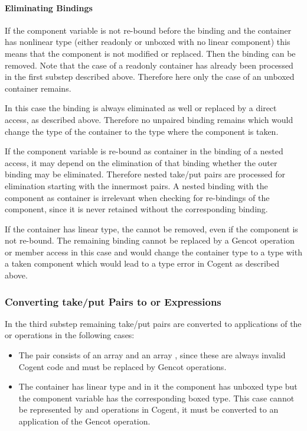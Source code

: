 \paragraph{Eliminating  Bindings}

If the component variable is not re-bound before the  binding and the container has nonlinear type (either readonly
or unboxed with no linear component) this means that the component is not modified or replaced. Then the  binding
can be removed. Note that the case of a readonly container has already been processed in the first substep described above.
Therefore here only the case of an unboxed container remains.

In this case the  binding is always eliminated as well or replaced by a direct access, as described above.
Therefore no unpaired  binding remains which would change the type of the container
to the type where the component is taken.

If the component variable is re-bound as container in the  binding of a nested access, it may depend on the
elimination of that  binding whether the outer  binding may be eliminated. Therefore nested take/put pairs
are processed for elimination starting with the innermost pairs. A nested  binding with the component as container
is irrelevant when checking for re-bindings of the component, since it is never retained without the corresponding 
binding.

If the container has linear type, the  cannot be removed, even if the component is not re-bound. The remaining
 binding cannot be replaced by a Gencot operation or member access in this case and would change the container
type to a type with a taken component which would lead to a type error in Cogent as described above.

\subsubsection{Converting take/put Pairs to  or  Expressions}

In the third substep remaining take/put pairs are converted to applications of the  or  operations
in the following cases:
\begin{itemize}
\item The pair consists of an array  and an array , since these are always invalid Cogent code
and must be replaced by Gencot operations.
\item The container has linear type and in it the component has unboxed type but the component variable has the corresponding
boxed type. This case cannot be represented by  and  operations in Cogent, it must be converted to
an application of the Gencot  operation.
\end{itemize}

